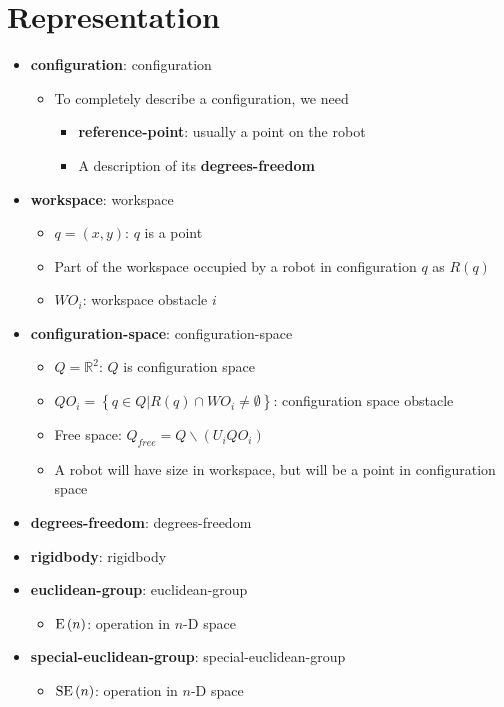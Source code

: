 \section{Representation}

\begin{itemize}
  \item \textbf{\Gls{configuration}}: \glsdesc{configuration}
  \begin{itemize}
    \item To completely describe a configuration, we need
    \begin{itemize}
      \item \textbf{\Gls{reference-point}}: usually a point on the robot
      \item A description of its \textbf{\gls{degrees-freedom}}
    \end{itemize}
  \end{itemize}

  \item \textbf{\Gls{workspace}}: \glsdesc{workspace}
  \begin{itemize}
    \item $ q = \left( x, y \right) $: $ q $ is a point
    \item Part of the \gls{workspace} occupied by a robot in \gls{configuration}
    $ q $ as $ R\left( q \right) $
    \item $ WO_{i} $: workspace obstacle $ i $
  \end{itemize}

  \item \textbf{\Gls{configuration-space}}: \glsdesc{configuration-space}
  \begin{itemize}
    \item $ Q = \mathbb{R}^{2} $: $ Q $ is configuration space
    \item $ Q O_{i} = \left\{ q \in Q | R\left( q \right) \cap WO_{i} \ne \emptyset \right\} $:
    configuration space obstacle
    \item Free space: $ Q_{free} = Q \backslash \left( U_{i} QO_{i} \right) $
    \item A robot will have size in workspace, but will be a point in configuration
    space
  \end{itemize}

  \item \textbf{\Gls{degrees-freedom}}: \glsdesc{degrees-freedom}
  \item \textbf{\Gls{rigidbody}}: \glsdesc{rigidbody}
  \item \textbf{\Gls{euclidean-group}}: \glsdesc{euclidean-group}
  \begin{itemize}
    \item $ \operatorname{E}\left( n \right) $: operation in $ n $-D space
  \end{itemize}

  \item \textbf{\Gls{special-euclidean-group}}: \glsdesc{special-euclidean-group}
  \begin{itemize}
    \item $ \operatorname{SE}\left( n \right) $: operation in $ n $-D space
  \end{itemize}
\end{itemize}

